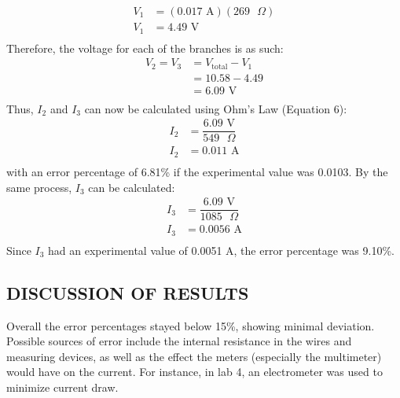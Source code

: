 \documentclass [12pt, letterpaper, twoside] {article}
\begin{document}
\begin{equation*}
  \begin{split}
    V_{1} &= (0.017\text{ A})(269\text{ }\Omega) \\
    V_{1} &= 4.49\text{ V} \\ %
  \end{split}
\end{equation*}
Therefore, the voltage for each of the branches is as such:
\begin{equation*}
  \begin{split}
    V_{2} = V_{3} &= V_{\text{total}} - V_{1} \\
    &= 10.58 - 4.49 \\
    &= 6.09 \text{ V} \\ %
  \end{split}
\end{equation*} 
Thus, \(I_{2}\) and \(I_{3}\) can now be calculated using Ohm's Law (Equation 6):
\begin{equation*}
  \begin{split}
    I_{2} &= \dfrac{6.09\text{ V}}{549\text{ }\Omega} \\
    I_{2} &= 0.011 \text{ A} \\ %
  \end{split}
\end{equation*}
with an error percentage of 6.81\% if the experimental value was 0.0103. By the same process, \(I_{3}\) can be calculated: %
\begin{equation*}
  \begin{split}
    I_{3} &= \dfrac{6.09\text{ V}}{1085\text{ }\Omega} \\
    I_{3} &= 0.0056 \text{ A} \\ %
  \end{split}
\end{equation*}
Since \(I_{3}\) had an experimental value of 0.0051 A, the error percentage was 9.10\%. %

\subsection* {DISCUSSION OF RESULTS}
Overall the error percentages stayed below 15\%, showing minimal deviation. Possible sources of error include the internal resistance in the wires and measuring devices, as well as the effect the meters (especially the multimeter) would have on the current. For instance, in lab 4, an electrometer was used to minimize current draw.
\end{document}
